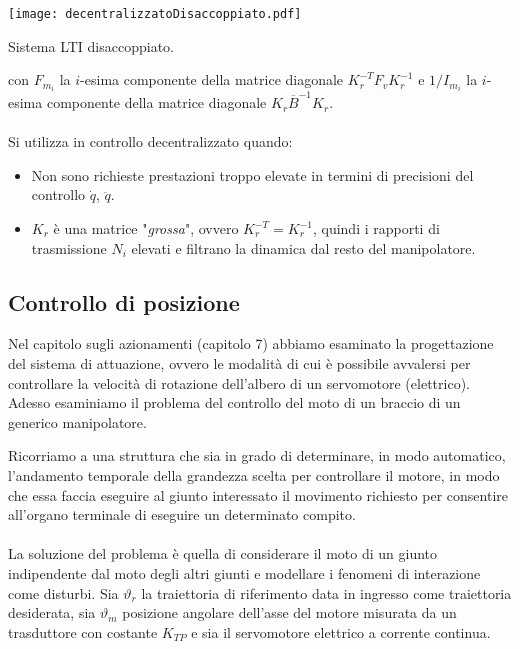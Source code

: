 \begin{center}
	\texttt{[image: decentralizzatoDisaccoppiato.pdf]}
	\caption{Sistema LTI disaccoppiato.}
\end{center}

con $F_{m_i}$ la $i$-esima componente della matrice diagonale $K_r^{-T} F_v K_r^{-1}$ e $1/I_{m_i}$ la $i$-esima componente della matrice diagonale $K_r \overline{B}^{-1} K_r$.

\paragraph{}
Si utilizza in controllo decentralizzato quando:
\begin{itemize}
	\item Non sono richieste prestazioni troppo elevate in termini di precisioni del controllo $\dot{q}$, $\ddot{q}$.
	\item $K_r$ è una matrice "\emph{grossa}", ovvero $K_r^{-T} = K_r^{-1}$, quindi i rapporti di trasmissione $N_i$ elevati e filtrano la dinamica dal resto del manipolatore.
\end{itemize}


\subsection{Controllo di posizione}
Nel capitolo sugli azionamenti (capitolo 7) abbiamo esaminato la progettazione del sistema di attuazione, ovvero le modalità di cui è possibile avvalersi per controllare la velocità di rotazione dell'albero di un servomotore (elettrico). Adesso esaminiamo il problema del controllo del moto di un braccio di un generico manipolatore.

Ricorriamo a una struttura che sia in grado di determinare, in modo automatico, l'andamento temporale della grandezza scelta per controllare il motore, in modo che essa faccia eseguire al giunto interessato il movimento richiesto per consentire all'organo terminale di eseguire un determinato compito. 

\paragraph{}
La soluzione del problema è quella di considerare il moto di un giunto indipendente dal moto degli altri giunti e modellare i fenomeni di interazione come disturbi. Sia $\vartheta_r$ la traiettoria di riferimento data in ingresso come traiettoria desiderata, sia $\vartheta_m$ posizione angolare dell'asse del motore misurata da un trasduttore con costante $K_{TP}$ e sia il servomotore elettrico a corrente continua. 


